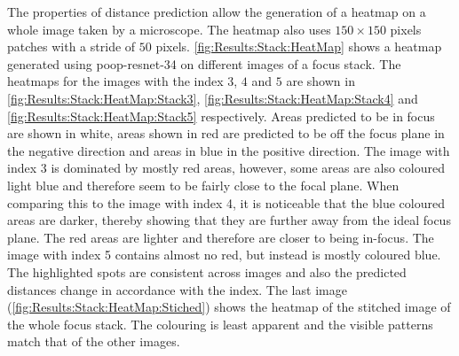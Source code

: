 The properties of distance prediction allow the generation of a heatmap on a whole image taken by a microscope. The heatmap also uses $150 \times 150$ pixels patches with a stride of $50$ pixels. \autoref{fig:Results:Stack:HeatMap} shows a heatmap generated using \acs{poop}-\acs{resnet}-34 on different images of a focus stack. The heatmaps for the images with the index $3$, $4$ and $5$ are shown in \autoref{fig:Results:Stack:HeatMap:Stack3}, \autoref{fig:Results:Stack:HeatMap:Stack4} and \autoref{fig:Results:Stack:HeatMap:Stack5} respectively. Areas predicted to be in focus are shown in white, areas shown in red are predicted to be off the focus plane in the negative direction and areas in blue in the positive direction. The image with index 3 is dominated by mostly red areas, however, some areas are also coloured light blue and therefore seem to be fairly close to the focal plane. When comparing this to the image with index 4, it is noticeable that the blue coloured areas are darker, thereby showing that they are further away from the ideal focus plane. The red areas are lighter and therefore are closer to being in-focus. The image with index 5 contains almost no red, but instead is mostly coloured blue. The highlighted spots are consistent across images and also the predicted distances change in accordance with the index. The last image (\autoref{fig:Results:Stack:HeatMap:Stiched}) shows the heatmap of the stitched image of the whole focus stack. The colouring is least apparent and the visible patterns match that of the other images.

